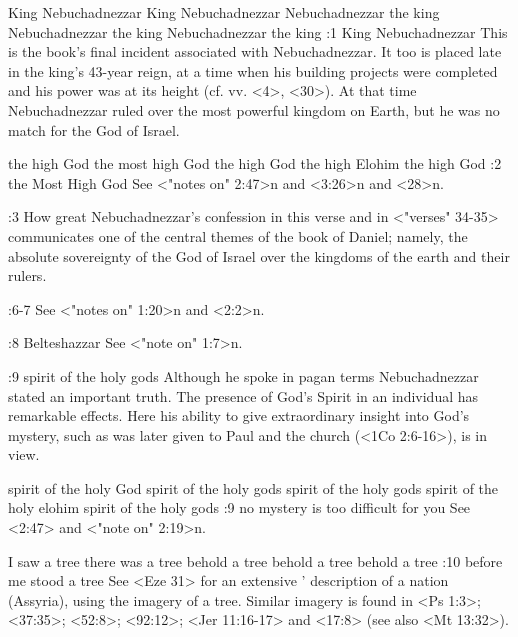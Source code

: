     {King Nebuchadnezzar} %
    {King Nebuchadnezzar} %
    {Nebuchadnezzar the king} %
    {Nebuchadnezzar the king} %
    {Nebuchadnezzar the king} %
:1 {King Nebuchadnezzar} This is the book's final incident associated with Nebuchadnezzar. It too is
placed late in the king's 43-year reign, at a time when his building projects were completed 
and his power was at its height (cf. vv. <4>, <30>). At that time Nebuchadnezzar ruled over the most
powerful kingdom on Earth, but he was no match for the God of Israel.

    {the high God} %
    {the most high God} %
    {the high God} %
    {the high Elohim} %
    {the high God} %
:2 {the Most High God} See <"notes on" 2:47>n and <3:26>n and <28>n.

:3 {How great} Nebuchadnezzar's confession in this verse 
and in <"verses" 34-35> communicates one of the central themes of 
the book of Daniel; namely, the absolute sovereignty of the God of 
Israel over the kingdoms of the earth and their rulers.

:6-7 {}  See <"notes on" 1:20>n and <2:2>n. 

:8 {Belteshazzar} See <"note on" 1:7>n.

\ww {} %
    {} %
    {} %
    {} %
    {} %
    {} %
:9 {spirit of the holy gods} Although he spoke in pagan terms 
Nebuchadnezzar stated an important truth. The presence of God's 
Spirit in an individual has remarkable effects. Here his ability to 
give extraordinary insight into God's mystery, such as was later given to Paul and the church
(<1Co 2:6-16>), is in view.

    {spirit of the holy God} %
    {spirit of the holy gods} %
    {spirit of the holy gods} %
    {spirit of the holy elohim} %
    {spirit of the holy gods} %
:9 {no mystery is too difficult for you} See <2:47> and <"note on" 2:19>n.

    {I saw a tree} %
    {there was a tree} %
    {behold a tree} %
    {behold a tree} %
    {behold a tree} %
:10 {before me stood a tree} See <Eze 31> for an extensive ' description of a nation (Assyria), %
using the imagery of a tree. Similar imagery is found in <Ps 1:3>; <37:35>; <52:8>; <92:12>; <Jer
11:16-17> and <17:8>  (see also <Mt 13:32>).


